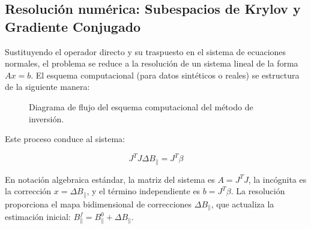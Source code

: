 \subsection{Resolución numérica: Subespacios de Krylov y Gradiente Conjugado}

Sustituyendo el operador directo y su traspuesto en el sistema de ecuaciones normales, el problema se reduce a la resolución de un sistema lineal de la forma $Ax = b$. El esquema computacional (para datos sintéticos o reales) se estructura de la siguiente manera:

\begin{figure}[H]
    \centering
    \caption{Diagrama de flujo del esquema computacional del método de inversión.}
    \label{fig:flowchart_metodo}
\end{figure}

Este proceso conduce al sistema:

\begin{equation}
    J^T J \Delta B_{\parallel} = J^T \beta \label{eq:sistemaEcReal}
\end{equation}

En notación algebraica estándar, la matriz del sistema es $A = J^T J$, la incógnita es la corrección $x = \Delta B_{\parallel}$, y el término independiente es $b = J^T \beta$. La resolución proporciona el mapa bidimensional de correcciones $\Delta B_{\parallel}$, que actualiza la estimación inicial: $B_{\parallel}^f = B_{\parallel}^0 + \Delta B_{\parallel}$.

